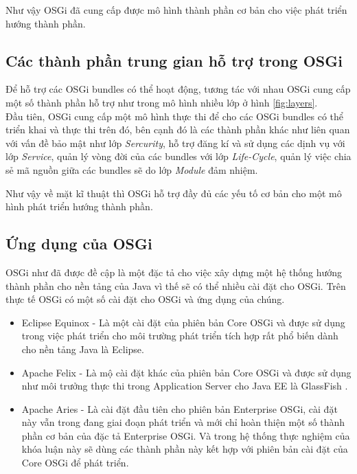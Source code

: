 Như vậy OSGi đã cung cấp được mô hình thành phần cơ bản cho việc phát triển hướng thành phần.

\subsection{Các thành phần trung gian hỗ trợ trong OSGi}
Để hỗ trợ các OSGi bundles có thể hoạt động, tương tác với nhau OSGi cung cấp một số thành phần hỗ trợ như trong mô hình nhiều lớp ở hình \ref{fig:layers}.\\

Đầu tiên, OSGi cung cấp một mô hình thực thi để cho các OSGi bundles có thể triển khai và thực thi trên đó, bên cạnh đó là các thành phần khác như liên quan với vấn đề bảo mật như lớp \textit{Sercurity}, hỗ trợ đăng kí và sử dụng các dịnh vụ với lớp \textit{Service}, quản lý vòng đời của các bundles với lớp \textit{Life-Cycle}, quản lý việc chia sẻ mã nguồn giữa các bundles sẽ do lớp \textit{Module} đảm nhiệm.

Như vậy về mặt kĩ thuật thì OSGi hỗ trợ đầy đủ các yếu tố cơ bản cho một mô hình phát triển hướng thành phần.

\subsection{Ứng dụng của OSGi}
OSGi như đã được đề cập là một đặc tả cho việc xây dựng một hệ thống hướng thành phần cho nền tảng của Java vì thế sẽ có thể nhiều cài đặt cho OSGi. Trên thực tế OSGi có một số cài đặt cho OSGi và ứng dụng của chúng.

\begin{itemize}
	\item Eclipse Equinox \cite{equinox} - Là một cài đặt của phiên bản Core OSGi và được sử dụng trong việc phát triển cho môi trường phát triển tích hợp rất phổ biến dành cho nền tảng Java là Eclipse.
	\item Apache Felix \cite{felix} - Là mộ cài đặt khác của phiên bản Core OSGi và được sử dụng như môi trưởng thực thi trong Application Server cho Java EE là GlassFish \cite{glass}.
	\item Apache Aries \cite{aries} - Là cài đặt đầu tiên cho phiên bản Enterprise OSGi, cài đặt này vẫn trong đang giai đoạn phát triển và mới chỉ hoàn thiện một số thành phần cơ bản của đặc tả Enterprise OSGi. Và trong hệ thống thực nghiệm của khóa luận này sẽ dùng các thành phần này kết hợp với phiên bản cài đặt của Core OSGi để phát triển.
\end{itemize}






